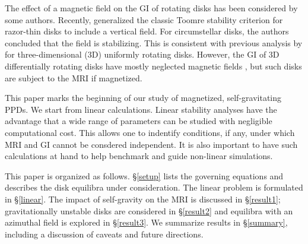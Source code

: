 \documentclass[iop]{emulateapj}
\begin{document}


The effect of a magnetic field on the GI of rotating disks has been
considered by some authors.  
Recently, \cite{lizano10} generalized the classic Toomre stability
criterion for razor-thin disks to include a vertical field. For
circumstellar disks, the authors concluded that the field is
stabilizing. This is consistent with previous analysis by
\cite{nakamura83} for three-dimensional (3D) uniformly rotating
disks. However, the GI of 3D differentially rotating disks have
mostly neglected magnetic fields \citep{mamat10,kim12}, but such disks
are subject to the MRI if magnetized. 
%


This paper marks the beginning of our study of magnetized,
self-gravitating PPDs. We start from linear calculations. 
Linear stability analyses have the advantage that a wide range of
parameters can be studied with negligible computational cost. This
allows one to indentify conditions, if any, under which MRI and GI
cannot be consdered independent. It is also important to have such 
calculations at hand to help benchmark and guide non-linear
simulations.   


This paper is organized as follows. \S\ref{setup} lists the governing
equations and describes the disk equilibra under consideration. 
The linear problem is formulated in \S\ref{linear}. The impact
of self-gravity on the MRI is discussed in
\S\ref{result1}; gravitationally unstable disks are considered in
\S\ref{result2} and equilibra with an azimuthal field is explored in
\S\ref{result3}. We summarize results in \S\ref{summary}, including a
discussion of caveats and future directions. 





 


\appendix




\end{document}
